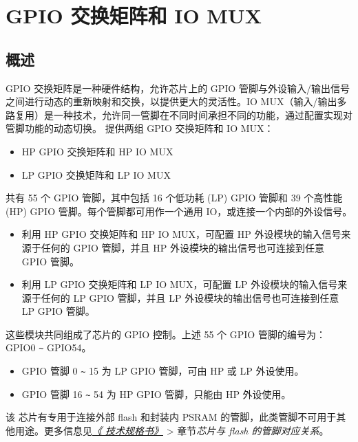 \documentclass[main\_\_CN.tex]{subfiles}
\begin{document}

\ifglobal
\else
    {\let\clearpage\relax \listoftodos}
    {\let\clearpage\relax \listofdonetodos}
    \tableofcontents
\fi



\hypertarget{iomuxgpio}{}
\chapter{GPIO 交换矩阵和 IO MUX}
\label{mod:iomuxgpio}

\section{概述}
GPIO 交换矩阵是一种硬件结构，允许芯片上的 GPIO 管脚与外设输入/输出信号之间进行动态的重新映射和交换，以提供更大的灵活性。IO MUX（输入/输出多路复用）是一种技术，允许同一管脚在不同时间承担不同的功能，通过配置实现对管脚功能的动态切换。\chipname{} 提供两组 GPIO 交换矩阵和 IO MUX：
\begin{itemize}
    \item HP GPIO 交换矩阵和 HP IO MUX
    \item LP GPIO 交换矩阵和 LP IO MUX
\end{itemize}

\chipname{} 共有 55 个 GPIO 管脚，其中包括 16 个低功耗 (LP) GPIO 管脚和 39 个高性能 (HP) GPIO 管脚。每个管脚都可用作一个通用 IO，或连接一个内部的外设信号。
\begin{itemize}
\item 利用 HP GPIO 交换矩阵和 HP IO MUX，可配置 HP 外设模块的输入信号来源于任何的 GPIO 管脚，并且 HP 外设模块的输出信号也可连接到任意 GPIO 管脚。
\item 利用 LP GPIO 交换矩阵和 LP IO MUX，可配置 LP 外设模块的输入信号来源于任何的 LP GPIO 管脚，并且 LP 外设模块的输出信号也可连接到任意 LP GPIO 管脚。

\end{itemize}
这些模块共同组成了芯片的 GPIO 控制。上述 55 个 GPIO 管脚的编号为：GPIO0 \verb+~+ GPIO54。
    \begin{itemize}
        \item GPIO 管脚 0 \verb+~+ 15 为 LP GPIO 管脚，可由 HP 或 LP 外设使用。
        \item GPIO 管脚 16 \verb+~+ 54 为 HP GPIO 管脚，只能由 HP 外设使用。
    \end{itemize}
该 \chipname{} 芯片有专用于连接外部 flash 和封装内 PSRAM 的管脚，此类管脚不可用于其他用途。更多信息见\textit{\href{https://www.espressif.com/sites/default/files/documentation/esp32-p4_datasheet_cn.pdf}{《\chipname{} 技术规格书》}} > 章节\textit{芯片与 flash 的管脚对应关系}。
\end{document}
